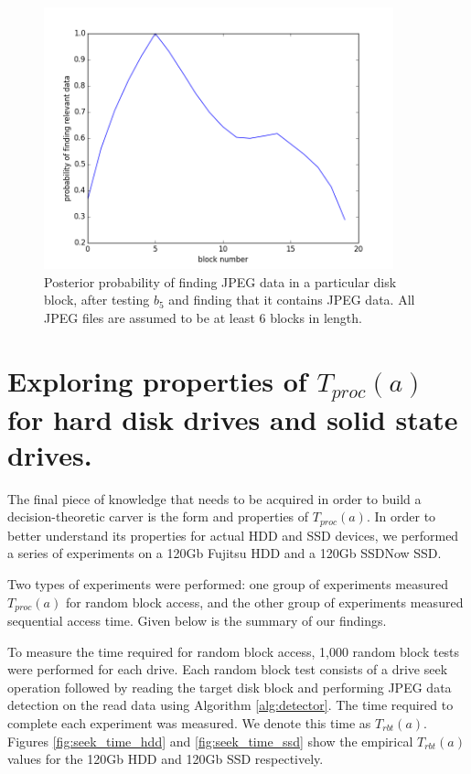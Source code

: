 \documentclass[final,5p,times,twocolumn,authoryear]{elsarticle}
\begin{document}
\begin{figure}
  \centerline{\includegraphics[width=0.9\textwidth]{figures/fig-20blk-6min-20max-testloc-5-1-2d}}
  \caption{Posterior probability of finding JPEG data in a particular disk block, after testing $b_5$ and finding that it contains JPEG data. All JPEG files are assumed to be at least 6 blocks in length.}
  \label{fig:fig-20blk-6min-20max-testloc-5-1-2d}
\end{figure}

\section{Exploring properties of $T_{proc}(a)$ for hard disk drives and solid state drives.}
\label{sec:tproc}

The final piece of knowledge that needs to be acquired in order to build a decision-theoretic carver is the form and properties of $T_{proc}(a)$. In order to better understand its properties for actual HDD and SSD devices, we performed a series of experiments on a 120Gb Fujitsu HDD and a 120Gb SSDNow SSD. 

Two types of experiments were performed: one group of experiments measured $T_{proc}(a)$ for random block access, and the other group of experiments measured sequential access time. Given below is the summary of our findings.

To measure the time required for random block access, 1,000 random block tests were performed for each drive. Each random block test consists of a drive seek operation followed by reading the target disk block and performing JPEG data detection on the read data using Algorithm \ref{alg:detector}. The time required to complete each experiment was measured. We denote this time as $T_{rbt}(a)$. Figures \ref{fig:seek_time_hdd} and \ref{fig:seek_time_ssd} show the empirical $T_{rbt}(a)$ values for the 120Gb HDD and 120Gb SSD respectively. 
\end{document}

